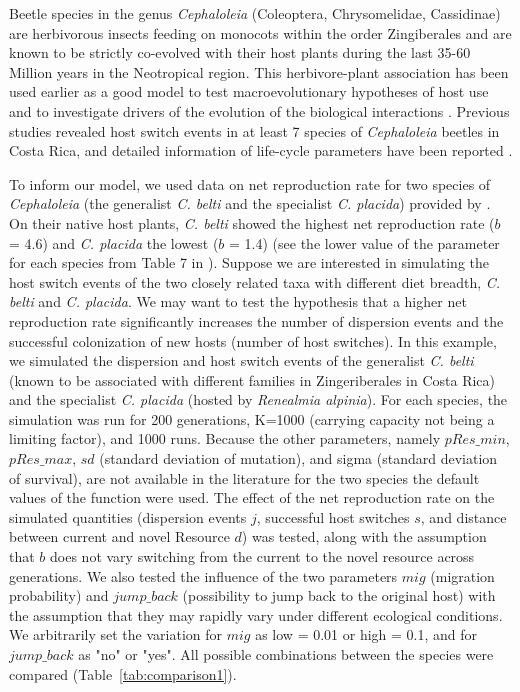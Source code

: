 Beetle species in the genus \textit{Cephaloleia} (Coleoptera, Chrysomelidae, Cassidinae) are herbivorous insects feeding on monocots within the order Zingiberales and are known to be strictly co-evolved with their host plants during the last 35-60 Million years in the Neotropical region.
This herbivore-plant association has been used earlier as a good model to test macroevolutionary hypotheses of host use and to investigate drivers of the evolution of the biological interactions
\citep{garcia2011experimental,schmitt2013notes}. Previous studies revealed host switch events in at least 7 species of \textit{Cephaloleia} beetles in Costa Rica, and detailed information of life-cycle parameters have been reported \citep{garcia2011experimental,garcia2010larval}.

To inform our model, we used data on net reproduction rate for two species of \textit{Cephaloleia}  (the generalist \textit{C. belti} and the specialist \textit{C. placida}) provided by \citet{garcia2011experimental}. On their native host plants, \textit{C. belti} showed the highest net reproduction rate ($b$ = 4.6) and \textit{C. placida} the lowest ($b$ = 1.4) (see the lower value of the parameter for each species from Table 7 in \citet{garcia2011experimental}).
Suppose we are interested in simulating the host switch events of the two closely related taxa with different diet breadth, \textit{C. belti} and \textit{C. placida}. We may want to test the hypothesis that a higher net reproduction rate significantly increases the number of dispersion events and the successful colonization of new hosts (number of host switches).
In this example, we simulated the dispersion and host switch events of the generalist \textit{C. belti} (known to be associated with different families in Zingeriberales in Costa Rica) and the specialist \textit{C. placida} (hosted by \textit{Renealmia alpinia}). For each species, the simulation was run for 200 generations, K=1000 (carrying capacity not being a limiting factor), and 1000 runs. Because the other parameters, namely $pRes\_min$, $pRes\_max$, $sd$ (standard deviation of mutation), and sigma (standard deviation of survival), are not available in the literature for the two species the default values of the  function were used. The effect of the net reproduction rate on the simulated quantities (dispersion events $j$, successful host switches $s$, and distance between current and novel Resource $d$) was tested, along with the assumption that $b$ does not vary switching from the current to the novel resource across generations.
We also tested the influence of the two parameters $mig$ (migration probability) and $jump\_back$ (possibility to jump back to the original host) with the assumption that they may rapidly vary under different ecological conditions. We arbitrarily set the variation for $mig$ as low = 0.01 or high = 0.1, and  for $jump\_back$ as "no" or "yes". All possible combinations between the species were compared (Table~\ref{tab:comparison1}).

